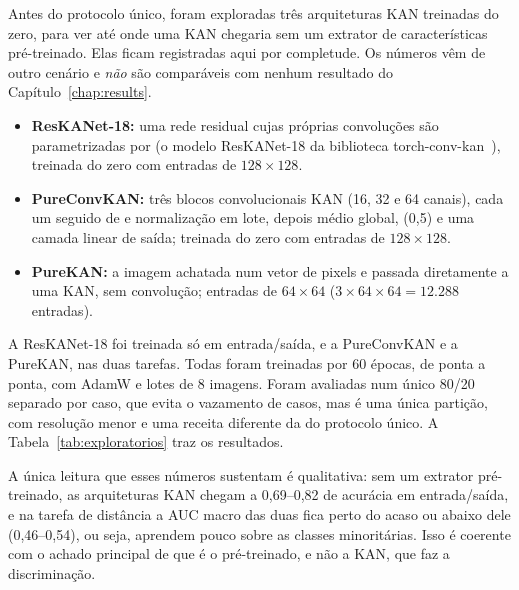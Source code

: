 \label{chap:apendice_exploratorios}

Antes do protocolo único, foram exploradas três arquiteturas KAN treinadas do zero, para ver até onde uma KAN chegaria sem um extrator de características pré-treinado. Elas ficam registradas aqui por completude. Os números vêm de outro cenário e \emph{não} são comparáveis com nenhum resultado do Capítulo~\ref{chap:results}.

\begin{itemize}
    \item \textbf{ResKANet-18:} uma rede residual cujas próprias convoluções são parametrizadas por  (o modelo ResKANet-18 da biblioteca torch-conv-kan~\cite{drokin2024torchconvkan}), treinada do zero com entradas de $128 \times 128$.
    \item \textbf{PureConvKAN:} três blocos convolucionais KAN (16, 32 e 64 canais), cada um seguido de  e normalização em lote, depois  médio global,  (0,5) e uma camada linear de saída; treinada do zero com entradas de $128 \times 128$.
    \item \textbf{PureKAN:} a imagem achatada num vetor de pixels e passada diretamente a uma KAN, sem convolução; entradas de $64 \times 64$ ($3 \times 64 \times 64 = 12.288$ entradas).
\end{itemize}

A ResKANet-18 foi treinada só em entrada/saída, e a PureConvKAN e a PureKAN, nas duas tarefas. Todas foram treinadas por 60 épocas, de ponta a ponta, com AdamW e lotes de 8 imagens. Foram avaliadas num único  80/20 separado por caso, que evita o vazamento de casos, mas é uma única partição, com resolução menor e uma receita diferente da do protocolo único. A Tabela~\ref{tab:exploratorios} traz os resultados.



A única leitura que esses números sustentam é qualitativa: sem um extrator pré-treinado, as arquiteturas KAN chegam a 0,69--0,82 de acurácia em entrada/saída, e na tarefa de distância a AUC macro das duas fica perto do acaso ou abaixo dele (0,46--0,54), ou seja, aprendem pouco sobre as classes minoritárias. Isso é coerente com o achado principal de que é o  pré-treinado, e não a KAN, que faz a discriminação.
